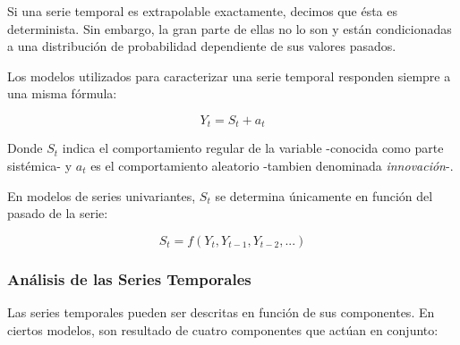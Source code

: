 \documentclass[a4paper,10pt]{article}
\begin{document}
Si una serie temporal es extrapolable exactamente, decimos que ésta es determinista. Sin embargo, la gran parte de ellas no lo son y están condicionadas a una distribución de probabilidad dependiente de sus valores pasados.

Los modelos utilizados para caracterizar una serie temporal responden siempre a una misma fórmula:

\begin{equation}\label{eqn:sistinnov}
 Y_t = S_t + a_t
\end{equation}

Donde $S_t$ indica el comportamiento regular de la variable -conocida como parte sistémica- y $a_t$ es el comportamiento aleatorio -tambien denominada \textit{innovación}-.

En modelos de series univariantes, $S_t$ se determina únicamente en función del pasado de la serie:

\begin{equation}
 S_t = f(Y_t, Y_{t-1}, Y_{t-2},...)
\end{equation}



\subsubsection{Análisis de las Series Temporales}

Las series temporales pueden ser descritas en función de sus componentes. En ciertos modelos, son resultado de cuatro componentes que actúan en conjunto:
\end{document}
